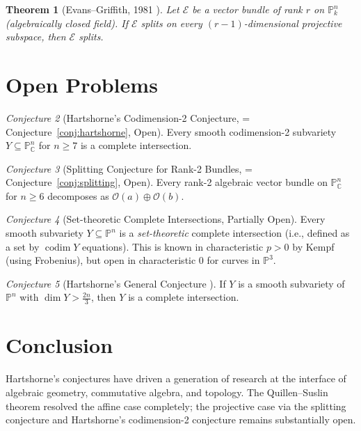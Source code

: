 \documentclass[12pt,a4paper]{amsart}
\newtheorem{theorem}{Theorem}[section]
\theoremstyle{definition}
\theoremstyle{remark}
\newtheorem{conjecture}[theorem]{Conjecture}
\DeclareMathOperator{\codim}{codim}
\newcommand{\PP}{\mathbb{P}}
\newcommand{\CC}{\mathbb{C}}
\newcommand{\OO}{\mathcal{O}}
\begin{document}
\begin{theorem}[Evans--Griffith, 1981 \cite{EvansGriffith1981}]
Let $\mathcal{E}$ be a vector bundle of rank $r$ on $\PP^n_k$ (algebraically
closed field).  If $\mathcal{E}$ splits on every $(r-1)$-dimensional projective
subspace, then $\mathcal{E}$ splits.
\end{theorem}

\section{Open Problems}

\begin{conjecture}[Hartshorne's Codimension-2 Conjecture, = Conjecture~\ref{conj:hartshorne}, Open]
Every smooth codimension-2 subvariety $Y \subseteq \PP^n_\CC$ for $n \ge 7$
is a complete intersection.
\end{conjecture}

\begin{conjecture}[Splitting Conjecture for Rank-2 Bundles, = Conjecture~\ref{conj:splitting}, Open]
Every rank-2 algebraic vector bundle on $\PP^n_\CC$ for $n \ge 6$
decomposes as $\OO(a) \oplus \OO(b)$.
\end{conjecture}

\begin{conjecture}[Set-theoretic Complete Intersections, Partially Open]
Every smooth subvariety $Y \subseteq \PP^n$ is a \emph{set-theoretic}
complete intersection (i.e., defined as a set by $\codim Y$ equations).
This is known in characteristic $p > 0$ by Kempf (using Frobenius), but
open in characteristic 0 for curves in $\PP^3$.
\end{conjecture}

\begin{conjecture}[Hartshorne's General Conjecture \cite{Hartshorne1974}]
If $Y$ is a smooth subvariety of $\PP^n$ with $\dim Y > \frac{2n}{3}$,
then $Y$ is a complete intersection.
\end{conjecture}

\section{Conclusion}

Hartshorne's conjectures have driven a generation of research at the
interface of algebraic geometry, commutative algebra, and topology.  The
Quillen--Suslin theorem resolved the affine case completely; the projective
case via the splitting conjecture and Hartshorne's codimension-2 conjecture
remains substantially open.
\end{document}
